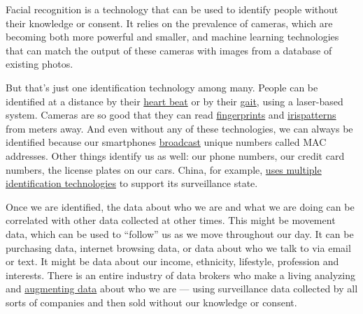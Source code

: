 Facial recognition is a technology that can be used to identify people
without their knowledge or consent. It relies on the prevalence of
cameras, which are becoming both more powerful and smaller, and machine
learning technologies that can match the output of these cameras with
images from a database of existing photos.

But that's just one identification technology among many. People can be
identified at a distance by their
\href{https://www.technologyreview.com/s/613891/the-pentagon-has-a-laser-that-can-identify-people-from-a-distanceby-their-heartbeat/}{heart
beat} or by their
\href{http://www.watrix.ai/en/gait-recognition/}{gait}, using a
laser-based system. Cameras are so good that they can read
\href{https://www.technologyreview.com/s/422400/fingerprints-go-the-distance/}{fingerprints}
and
\href{https://www.theatlantic.com/technology/archive/2015/05/long-range-iris-scanning-is-here/393065/}{iris}\textbf{\href{https://www.theatlantic.com/technology/archive/2015/05/long-range-iris-scanning-is-here/393065/}{}}\href{https://www.theatlantic.com/technology/archive/2015/05/long-range-iris-scanning-is-here/393065/}{patterns}
from meters away. And even without any of these technologies, we can
always be identified because our smartphones
\href{https://www.howtogeek.com/196998/your-devices-broadcast-unique-numbers-and-theyre-being-used-to-track-you/}{broadcast}
unique numbers called MAC addresses. Other things identify us as well:
our phone numbers, our credit card numbers, the license plates on our
cars. China, for example,
\href{https://www.nytimes.com/2019/12/17/technology/china-surveillance.html}{uses
multiple identification technologies} to support its surveillance state.

Once we are identified, the data about who we are and what we are doing
can be correlated with other data collected at other times. This might
be movement data, which can be used to ``follow'' us as we move
throughout our day. It can be purchasing data, internet browsing data,
or data about who we talk to via email or text. It might be data about
our income, ethnicity, lifestyle, profession and interests. There is an
entire industry of data brokers who make a living analyzing and
\href{https://www.eff.org/wp/behind-the-one-way-mirror}{augmenting data}
about who we are --- using surveillance data collected by all sorts of
companies and then sold without our knowledge or consent.

